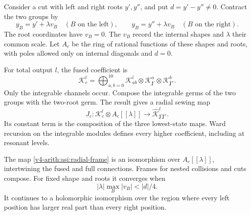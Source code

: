 Consider a cut with left and right roots \(y',y''\), and put
\(d=y'-y''\ne0\). Contract the two groups by
\[
 y_B=y'+\lambda v_B\quad(B\text{ on the left}),\qquad
 y_B=y''+\lambda v_B\quad(B\text{ on the right}).
\]
The root coordinates have \(v_B=0\). The \(v_B\) record the
internal shapes and \(\lambda\) their common scale.
Let \(A_c\) be the ring of rational functions of these shapes
and roots, with poles allowed only on internal diagonals and \(d=0\).

For total output \(l\), the fused coefficient is
\[
 \mathcal K_c^l
 =\bigoplus_{a,b=0}^{10}
   \mathcal K^l_{ab}\otimes
   \mathcal K^a_{\mathbf j'}\otimes
   \mathcal K^b_{\mathbf j''}.
\]
Only the integrable channels occur. Compose the integrable germs of
the two groups with the two-root germ. The result gives a radial
sewing map
\begin{equation}\label{v4-arith:asi:radial-frame}
 J_c:\mathcal K_c^l\otimes A_c[[\lambda]]
       \longrightarrow
       \widehat{\mathcal K}^l_{\mathbf j'\mathbf j''}.
\end{equation}
Its constant term is the composition of the three lowest-state
maps. Ward recursion on the integrable modules defines every
higher coefficient, including at resonant levels.

\begin{proposition}\label{v4-arith:asi:radial-sewing}
The map \eqref{v4-arith:asi:radial-frame} is an isomorphism over
\(A_c[[\lambda]]\), intertwining the fused and full connections.
Frames for nested collisions and cuts compose.
For fixed shape and roots it converges when
\[
 |\lambda|\max_B|v_B|<|d|/4.
\]
It continues to a holomorphic isomorphism over the region where
every left position has larger real part than every right position.
\end{proposition}

